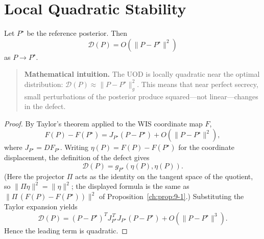 \section{Local Quadratic Stability}\label{ch:sec:local-quadratic-stability}
\begin{theorem}
\label{ch:thm:9-3}
Let
$P^\star$
be the reference posterior.
Then
\[
\mathcal D(P)
=
O(\|P-P^\star\|^2)
\]
as
$P\rightarrow P^\star.$
\end{theorem}

\begin{quote}
\textbf{Mathematical intuition.}
The UOD is locally quadratic near the optimal distribution: $\mathcal D(P)\approx\|P-P^\star\|_g^2$.
This means that near perfect secrecy, small perturbations of the posterior produce squared---not linear---changes in the defect.
\end{quote}

\begin{proof}
By Taylor's theorem applied to the WIS coordinate map $F$,
\[
F(P)-F(P^\star)
=
J_{P^\star}(P-P^\star)
+
O(\|P-P^\star\|^2),
\]
where
$J_{P^\star}=DF_{P^\star}.$
Writing $\eta(P)=F(P)-F(P^\star)$ for the coordinate displacement, the definition of the defect gives
\[
\mathcal D(P)
=
g_{P^\star}(\eta(P),\eta(P)).
\]
(Here the projector \(\Pi\) acts as the identity on the tangent
space of the quotient, so \(\|\Pi\eta\|^2=\|\eta\|^2\); the
displayed formula is the same as
\(\|\Pi\,(F(P)-F(P^\star))\|^2\) of Proposition~\ref{ch:prop:9-1}.)
Substituting the Taylor expansion yields
\[
\mathcal D(P)
=
(P-P^\star)^T
J_{P^\star}^{\,T}
J_{P^\star}
(P-P^\star)
+
O(\|P-P^\star\|^3).
\]
Hence the leading term is quadratic. 
\end{proof}

